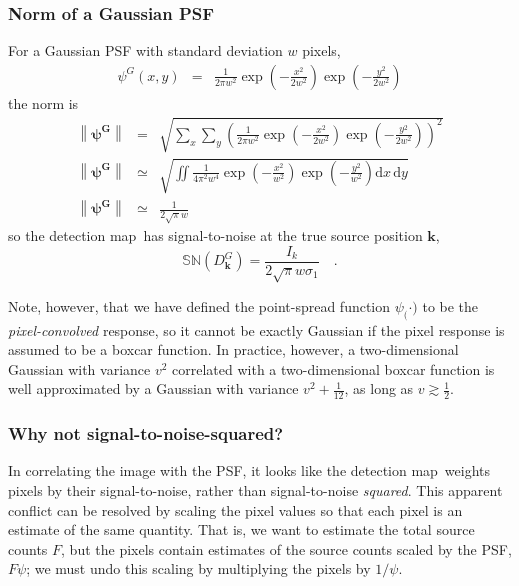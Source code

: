 \documentclass[letterpaper,preprint]{aastex62}
\newcommand{\detmap}{detection map}
\newcommand{\psf}{\psi}
\newcommand{\psfat}[1]{\psf_{#1}}
\newcommand{\snr}[1]{\mathbb{SN}(#1)}
\newcommand{\norm}[1]{\left\lVert #1 \right\rVert}
\newcommand{\psfw}{w}
\renewcommand{\vec}[1]{\boldsymbol{#1}}
\newcommand{\kvec}{\vec{k}}
\begin{document}
\subsubsection{Norm of a Gaussian PSF}
\label{app:gaussnorm}
For a Gaussian PSF with standard deviation $\psfw$ pixels,
\begin{eqnarray}\displaystyle
\psf^G(x,y) &=& \frac{1}{2 \pi \psfw^2} \exp{\left(-\frac{x^2}{2 \psfw^2}\right)} \exp{\left(-\frac{y^2}{2 \psfw^2}\right)}
\end{eqnarray}
the norm is%
\begin{eqnarray}
\norm{\bm{\psf^G}} &=& \sqrt{ \sum_{x} \sum_{y} \left(\frac{1}{2 \pi \psfw^2} \exp{\left(-\frac{x^2}{2 \psfw^2}\right)} \exp{\left(-\frac{y^2}{2 \psfw^2}\right)} \right)^2} \\
\norm{\bm{\psf^G}} &\simeq& \sqrt{\iint \frac{1}{4 \pi^2 \psfw^4} \exp{\left(-\frac{x^2}{\psfw^2}\right)} \exp{\left(-\frac{y^2}{\psfw^2}\right)} \mathrm{d}x \, \mathrm{d}y} \\
\norm{\bm{\psf^G}} &\simeq& \frac{1}{2 \sqrt{\pi} \psfw}
\end{eqnarray}
so the \detmap\ has signal-to-noise at the true source position $\kvec$,
\begin{equation}
\snr{D_{\kvec}^G} = \frac{I_k}{2 \sqrt{\pi} \psfw \sigma_1 } \quad .
\label{eqn:sndsinglegauss}
\end{equation}

Note, however, that we have defined the point-spread function
$\psfat(\cdot)$ to be the \emph{pixel-convolved} response, so it cannot
be exactly Gaussian if the pixel response is assumed to be a boxcar
function.  In practice, however, a two-dimensional Gaussian with
variance $v^2$ correlated with a two-dimensional boxcar function is
well approximated by a Gaussian with variance $v^2 + \frac{1}{12}$, as
long as $v \gtrsim \frac{1}{2}$.





\subsubsection{Why not signal-to-noise-squared?}
In correlating the image with the PSF, it looks like the
\detmap\ weights pixels by their signal-to-noise, rather than
signal-to-noise \emph{squared}.  This apparent conflict can be
resolved by scaling the pixel values so that each pixel is an estimate
of the same quantity.  That is, we want to estimate the total source
counts $F$, but the pixels contain estimates of the source counts
scaled by the PSF, $F \psf$; we must undo this scaling by multiplying
the pixels by $1/\psf$.
\end{document}
